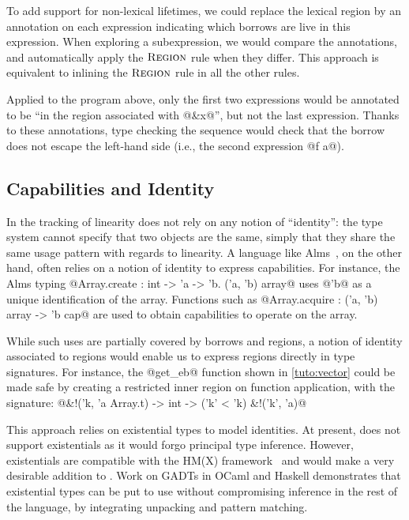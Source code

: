 To add support for non-lexical lifetimes, we could replace the
lexical region by an annotation on each expression indicating which borrows are
live in this expression.
When exploring a subexpression, we would compare the annotations, and automatically
apply the $\textsc{Region}$ rule when they differ.
%
This approach is equivalent to inlining the $\textsc{Region}$ rule in all the other
rules.

Applied to the program above, only the first two expressions would be annotated
to be ``in the region associated with @&x@'', but not the last expression.
Thanks to these annotations, type checking the sequence would check
that the borrow does not escape the left-hand side (i.e., the second
expression @f a@).

\subsection{Capabilities and Identity}
\label{identity}

In \lang the tracking of linearity does
not rely on any notion of ``identity'': the type system cannot specify that two
objects are the same, simply that they share the same usage pattern with
regards to linearity.
A language like Alms~\citep{DBLP:conf/popl/TovP11}, on the other hand,
often relies on a notion of identity to express capabilities.
For instance, the Alms typing
@Array.create : int -> 'a -> \E 'b. ('a, 'b) array@ uses
@'b@ as a  unique identification of the array.
Functions such as @Array.acquire : ('a, 'b) array -> 'b cap@
are used to obtain capabilities to operate on the array.

While such uses are partially covered by borrows and regions,
a notion of identity associated to regions
would enable us to express regions directly in type signatures.
For instance, the @get_eb@ function shown in
\cref{tuto:vector} could be made safe
by creating a restricted inner region on function application,
with the signature:
@&!('k, 'a Array.t) -> int -> \E ('k' < 'k) &!('k', 'a)@


This approach relies on existential types to model identities.
At present, \lang does not support existentials as it would
forgo principal type inference.
However, existentials
are compatible with the HM(X) framework~\citep{DBLP:conf/icfp/Simonet03}
and would make a very desirable addition to \lang. Work on GADTs in
OCaml and Haskell demonstrates
that existential types can be put to use without compromising
inference in the rest of the language, by integrating unpacking
and pattern matching.

